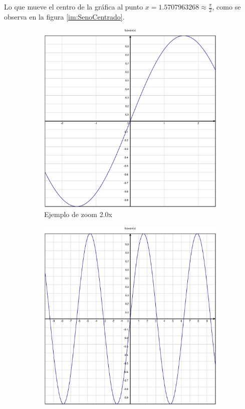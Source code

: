 \documentclass[10pt]{article}
\begin{document}
\noindent Lo que mueve el centro de la gráfica al punto $x=1.5707963268\approx\frac{\pi}{2}$, como se observa en la figura \ref{im:SenoCentrado}.
\begin{figure}[htbp]
    \centering
    \begin{subfigure}[b]{0.3\textwidth}
        \includegraphics[width=\textwidth]{figures/Seno2x.eps}
        \centering
        \caption{Ejemplo de zoom 2.0x}
        \label{im:Seno2x}
    \end{subfigure}
    \hfill
    \begin{subfigure}[b]{0.3\textwidth}
        \includegraphics[width=\textwidth]{figures/Seno05x.eps}

\end{subfigure}
\end{figure}
\end{document}
